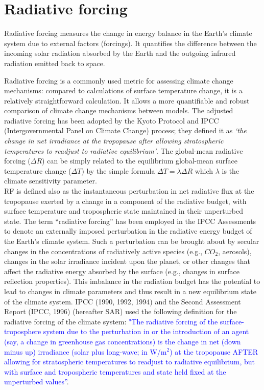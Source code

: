 \section{Radiative forcing}
Radiative forcing measures the change in energy balance in the Earth's climate system due to external factors (forcings). It quantifies the difference between the incoming solar radiation absorbed by the Earth and the outgoing infrared radiation emitted back to space. 


Radiative forcing is a commonly used metric for assessing climate change mechanisms: compared to calculations of surface temperature change, it is a relatively straightforward calculation. It allows a more quantifiable and robust comparison of climate change mechanisms between models. The adjusted radiative forcing has been adopted by the Kyoto Protocol and IPCC (Intergovernmental Panel on Climate Change) process; they defined it as \textit{‘the change in net irradiance at the tropopause after allowing stratospheric temperatures to readjust to radiative equilibrium’}. The global-mean radiative forcing ($\Delta R$) can be simply related to the equilibrium global-mean surface temperature change ($\Delta T$) by the simple formula $\Delta T=\lambda\Delta R$ which $\lambda$ is the climate sensitivity parameter.\\


RF is defined also as the instantaneous perturbation in net radiative flux at the tropopause exerted by a change in a component of the radiative budget,
with surface temperature and tropospheric state maintained in their
unperturbed state. The term “radiative forcing” has been employed in the IPCC Assessments to denote an externally imposed perturbation in the radiative energy budget of the Earth’s climate system.
Such a perturbation can be brought about by secular changes in the
concentrations of radiatively active species (e.g., $CO_2$, aerosols), changes in the solar irradiance incident upon the planet, or other changes that affect the radiative energy absorbed by the surface (e.g., changes in surface reflection properties).
This imbalance in the radiation budget has the potential to lead to changes in climate parameters and thus result in a new equilibrium state of the climate system. IPCC (1990, 1992, 1994) and the Second Assessment Report (IPCC, 1996)
(hereafter SAR) used the following definition for the radiative forcing of the climate system:
\textcolor{Blue}{"The radiative forcing of the surface-troposphere system due to the
perturbation in or the introduction of an agent (say, a change in greenhouse gas concentrations) is the change in net (down minus up) irradiance (solar plus long-wave; in W/m$^2$) at the tropopause AFTER allowing for stratospheric temperatures to readjust to radiative equilibrium, but with surface and tropospheric temperatures and state held fixed at the unperturbed values”}.\\



